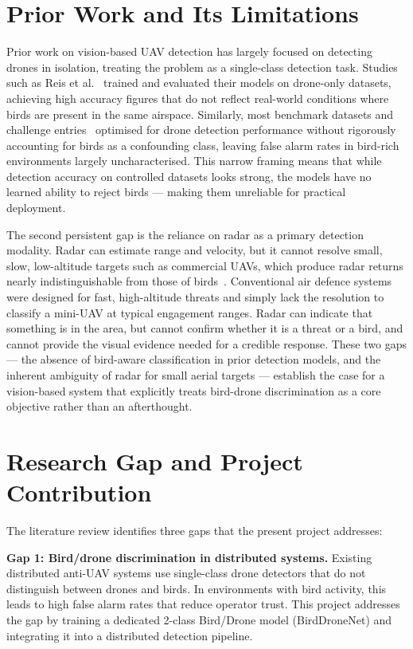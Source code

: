 \documentclass[12pt,a4paper]{report}
\begin{document}
\section{Prior Work and Its Limitations}

Prior work on vision-based UAV detection has largely focused on detecting drones in isolation, treating the problem as a single-class detection task. Studies such as Reis et al.~\cite{reis2024yolov8} trained and evaluated their models on drone-only datasets, achieving high accuracy figures that do not reflect real-world conditions where birds are present in the same airspace. Similarly, most benchmark datasets and challenge entries~\cite{coluccia2021dvsb} optimised for drone detection performance without rigorously accounting for birds as a confounding class, leaving false alarm rates in bird-rich environments largely uncharacterised. This narrow framing means that while detection accuracy on controlled datasets looks strong, the models have no learned ability to reject birds — making them unreliable for practical deployment.

The second persistent gap is the reliance on radar as a primary detection modality. Radar can estimate range and velocity, but it cannot resolve small, slow, low-altitude targets such as commercial UAVs, which produce radar returns nearly indistinguishable from those of birds~\cite{munir2023kfupm, patrick2024radar}. Conventional air defence systems were designed for fast, high-altitude threats and simply lack the resolution to classify a mini-UAV at typical engagement ranges. Radar can indicate that something is in the area, but cannot confirm whether it is a threat or a bird, and cannot provide the visual evidence needed for a credible response. These two gaps — the absence of bird-aware classification in prior detection models, and the inherent ambiguity of radar for small aerial targets — establish the case for a vision-based system that explicitly treats bird-drone discrimination as a core objective rather than an afterthought.

\section{Research Gap and Project Contribution}

The literature review identifies three gaps that the present project addresses:

\textbf{Gap 1: Bird/drone discrimination in distributed systems.}
Existing distributed anti-UAV systems use single-class drone detectors
that do not distinguish between drones and birds. In environments with
bird activity, this leads to high false alarm rates that reduce operator
trust. This project addresses the gap by training a dedicated 2-class
Bird/Drone model (BirdDroneNet) and integrating it into a distributed
detection pipeline.
\end{document}
